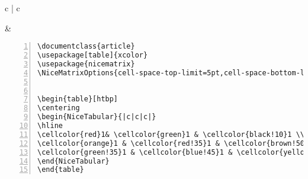 \begin{tabular}{c | c}
\begin{minipage}[m]{0.4\textwidth}
\end{minipage}
&
\begin{minipage}[m]{0.55\textwidth}
\renewcommand\textminus{\mbox{-}}%
\begin{lstlisting}[numberstyle=\zebra{green!15}{yellow!15},numbers=left,basicstyle=\footnotesize] 
\documentclass{article}
\usepackage[table]{xcolor}
\usepackage{nicematrix}
\NiceMatrixOptions{cell-space-top-limit=5pt,cell-space-bottom-limit=5pt}


\begin{table}[htbp]
\centering
\begin{NiceTabular}{|c|c|c|} 
\hline
\cellcolor{red}1& \cellcolor{green}1 & \cellcolor{black!10}1 \\ \hline 
\cellcolor{orange}1 & \cellcolor{red!35}1 & \cellcolor{brown!50}1 \\ \hline
\cellcolor{green!35}1 & \cellcolor{blue!45}1 & \cellcolor{yellow}1 \\ \hline
\end{NiceTabular}
\end{table}

\end{lstlisting}
\end{minipage}
\end{tabular}


